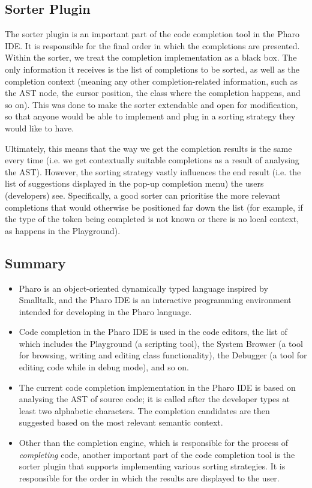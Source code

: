 \documentclass[sigplan,screen]{acmart}
\begin{document}
\subsection{Sorter Plugin}
The sorter plugin is an important part of the code completion tool in the Pharo IDE. It is responsible for the final order in which the completions are presented. Within the sorter, we treat the completion implementation as a black box. The only information it receives is the list of completions to be sorted, as well as the completion context (meaning any other completion-related information, such as the AST node, the cursor position, the class where the completion happens, and so on). This was done to make the sorter extendable and open for modification, so that anyone would be able to implement and plug in a sorting strategy they would like to have.

Ultimately, this means that the way we get the completion results is the same every time (i.e. we get contextually suitable completions as a result of analysing the AST). However, the sorting strategy vastly influences the end result (i.e. the list of suggestions displayed in the pop-up completion menu) the users (developers) see. Specifically, a good sorter can prioritise the more relevant completions that would otherwise be positioned far down the list (for example, if the type of the token being completed is not known or there is no local context, as happens in the Playground).

\subsection{Summary}
\begin{itemize}
    \item Pharo is an object-oriented dynamically typed language inspired by Smalltalk, and the Pharo IDE is an interactive programming environment intended for developing in the Pharo language.
    \item Code completion in the Pharo IDE is used in the code editors, the list of which includes the Playground (a scripting tool), the System Browser (a tool for browsing, writing and editing class functionality), the Debugger (a tool for editing code while in debug mode), and so on.
    \item The current code completion implementation in the Pharo IDE is based on analysing the AST of source code; it is called after the developer types at least two alphabetic characters. The completion candidates are then suggested based on the most relevant semantic context.
    \item Other than the completion engine, which is responsible for the process of \textit{completing} code, another important part of the code completion tool is the sorter plugin that supports implementing various sorting strategies. It is responsible for the order in which the results are displayed to the user.
\end{itemize}
\end{document}
